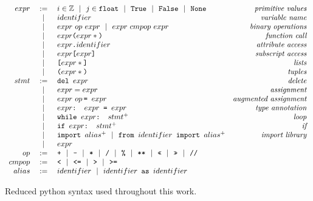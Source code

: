 \begin{figure}
\[\begin{array}{rclr}
    expr  &:=& i \in \mathbb{Z} ~~|~~ j \in \texttt{float} ~~|~~ \texttt{True} ~~|~~
    \texttt{False} ~~|~~ \texttt{None} & \textit{primitive values} \\
     &~~|~~& identifier & \textit{variable name} \\
     &~~|~~& expr~op~expr ~~|~~ expr~cmpop~expr & \textit{binary operations} \\
     &~~|~~& expr\texttt{(}expr*\texttt{)}     & \textit{function call} \\
     &~~|~~& expr\texttt{.}identifier & \textit{attribute access} \\
     &~~|~~& expr\texttt{[}expr\texttt{]}      & \textit{subscript access} \\
     &~~|~~& \texttt{[}expr*\texttt{]}         & \textit{lists} \\
     &~~|~~& \texttt{(}expr*\texttt{)}         & \textit{tuples} \\

  stmt &:=& \texttt{del } expr  & \textit{delete} \\
     &~~|~~& expr = expr         & \textit{assignment} \\
     &~~|~~& expr~op\hspace{-0.35em}\texttt{ = } expr       & \textit{augmented assignment} \\
     &~~|~~& expr\texttt{: } expr \texttt{ = } expr   & \textit{type annotation} \\
     &~~|~~& \texttt{while } expr\texttt{: } stmt^+   & \textit{loop} \\
     &~~|~~& \texttt{if } expr\texttt{: } stmt^+   & \textit{if} \\
     &~~|~~& \texttt{import } alias^+
     ~~|~~ \texttt{from } identifier \texttt{ import } alias^+   & \textit{import library} \\
     &~~|~~& expr & \\

  op &:=& \texttt{+} ~~|~~ \texttt{-} ~~|~~ \texttt{*} ~~|~~ \texttt{/} ~~|~~ \texttt{\%} ~~|~~ \texttt{**} ~~|~~
      \texttt{<<} ~~|~~ \texttt{>>} ~~|~~ \texttt{//}  & \\
  cmpop &:=& \texttt{<} ~~|~~ \texttt{<=} ~~|~~ \texttt{>} ~~|~~ \texttt{>=}  & \\

  alias &:=& identifier ~~|~~ identifier \texttt{ as } identifier  & \\

\end{array}\]
\caption{Reduced python syntax used throughout this work.\label{syntaxPython}}
\end{figure}

